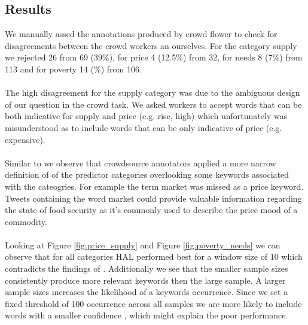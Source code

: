 \subsection{Results}

We manually assed the annotations produced by crowd flower to check for disagreements between the crowd workers an ourselves. For the category supply we rejected 26 from 69 (39\%), for price 4 (12.5\%) from 32, for needs 8 (7\%) from 113 and for poverty 14 (\%) from 106. \\
\\
The high disagreement for the supply category was due to the ambiguous design of our question in the crowd task. We asked workers to accept words that can be both indicative for supply and price (e.g. rise, high) which unfortunately was misunderstood as to include words that can be only indicative of price (e.g. expensive). \\
\\
Similar to \cite{olt15} we observe that crowdsource annotators applied a more narrow definition of of the predictor categories overlooking some keywords associated with the cateogries. For example the term market was missed as a price keyword. Tweets containing the word market could provide valuable information regarding the state of food security as it's commonly used to describe the price  mood of a commodity. \\
\\
Looking at Figure \ref{fig:price_supply} and Figure \ref{fig:poverty_needs} we can observe that for all categories HAL performed best for a window size of 10 which contradicts the findings of \cite{lund96}. Additionally we see that the smaller sample sizes consistently produce more relevant keywords then the large sample.  A larger sample sizes increases the likelihood of a keywords occurrence. Since we set a fixed threshold of 100 occurrence across all samples we are more likely to include words with a smaller confidence , which might explain the poor performance. 


